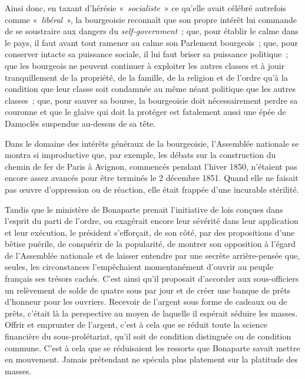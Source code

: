 \documentclass[french,twoside]{book} %
\begin{document}
Ainsi donc, en taxant d’hérésie « \emph{socialiste} » ce qu’elle avait célébré autrefois comme « \emph{libéral} », la bourgeoisie reconnaît que son propre intérêt lui commande de se soustraire aux dangers du \emph{self-government} ; que, pour établir le calme dans le pays, il faut avant tout ramener au calme son Parlement bourgeois ; que, pour conserver intacte sa puissance sociale, il lui faut briser sa puissance politique ; que les bourgeois ne peuvent continuer à exploiter les autres classes et à jouir tranquillement de la propriété, de la famille, de la religion et de l’ordre qu’à la condition que leur classe soit condamnée au même néant politique que les autres classes ; que, pour sauver sa bourse, la bourgeoisie doit nécessairement perdre sa couronne et que le glaive qui doit la protéger est fatalement aussi une épée de Damoclès suspendue au-dessus de sa tête.\par
Dans le domaine des intérêts généraux de la bourgeoisie, l’Assemblée nationale se montra si improductive que, par exemple, les débats sur la construction du chemin de fer de Paris à Avignon, commencés pendant l’hiver 1850, n’étaient pas encore assez avancés pour être terminés le 2 décembre 1851. Quand elle ne faisait pas œuvre d’oppression ou de réaction, elle était frappée d’une incurable stérilité.\par
Tandis que le ministère de Bonaparte prenait l’initiative de lois conçues dans l’esprit du parti de l’ordre, ou exagérait encore leur sévérité dans leur application et leur exécution, le président s’efforçait, de son côté, par des propositions d’une bêtise puérile, de conquérir de la popularité, de montrer son opposition à l’égard de l’Assemblée nationale et de laisser entendre par une secrète arrière-pensée que, seules, les circonstances l’empêchaient momentanément d’ouvrir au peuple français ses trésors cachés. C’est ainsi qu’il proposait d’accorder aux sous-officiers un relèvement de solde de quatre sous par jour et de créer une banque de prêts d’honneur pour les ouvriers. Recevoir de l’argent sous forme de cadeaux ou de prêts, c’était là la perspective au moyen de laquelle il espérait séduire les masses. Offrir et emprunter de l’argent, c’est à cela que se réduit toute la science financière du sous-prolétariat, qu’il soit de condition distinguée ou de condition commune. C’est à cela que se réduisaient les ressorts que Bonaparte savait mettre en mouvement. Jamais prétendant ne spécula plus platement sur la platitude des masses.\par
\end{document}
